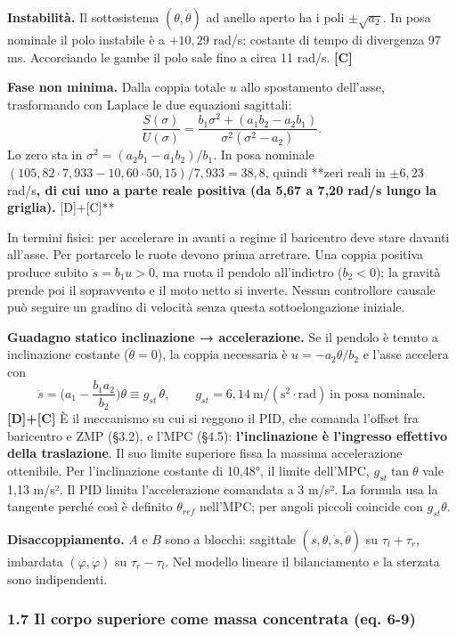 \documentclass[
]{article}
\begin{document}
\textbf{Instabilità.} Il sottosistema \((\theta, \dot\theta)\) ad anello aperto ha i poli \(\pm\sqrt{a_2}\). In posa nominale il polo instabile è a \(+10{,}29\) rad/s: costante di tempo di divergenza 97 ms. Accorciando le gambe il polo sale fino a circa 11 rad/s. \textbf{[C]}

\textbf{Fase non minima.} Dalla coppia totale \(u\) allo spostamento dell'asse, trasformando con Laplace le due equazioni sagittali: \[\frac{S(\sigma)}{U(\sigma)} = \frac{b_1\sigma^2 + (a_1b_2 - a_2b_1)}{\sigma^2(\sigma^2 - a_2)} .\] Lo zero sta in \(\sigma^2 = (a_2b_1 - a_1b_2)/b_1\). In posa nominale \((105{,}82\cdot7{,}933 - 10{,}60\cdot50{,}15)/7{,}933 = 38{,}8\), quindi **zeri reali in \(\pm 6{,}23\) rad/s\textbf{, di cui uno a parte reale positiva (da 5,67 a 7,20 rad/s lungo la griglia). }[D]+[C]**

In termini fisici: per accelerare in avanti a regime il baricentro deve stare davanti all'asse. Per portarcelo le ruote devono prima arretrare. Una coppia positiva produce subito \(\ddot s = b_1u > 0\), ma ruota il pendolo all'indietro (\(b_2 < 0\)); la gravità prende poi il sopravvento e il moto netto si inverte. Nessun controllore causale può seguire un gradino di velocità senza questa sottoelongazione iniziale.

\textbf{Guadagno statico inclinazione → accelerazione.} Se il pendolo è tenuto a inclinazione costante (\(\ddot\theta = 0\)), la coppia necessaria è \(u = -a_2\theta/b_2\) e l'asse accelera con \[\ddot s = \Big(a_1 - \frac{b_1a_2}{b_2}\Big)\theta \equiv g_{st}\,\theta,\qquad g_{st} = 6{,}14\ \mathrm{m/(s^2\cdot rad)}\ \text{in posa nominale}.\] \textbf{[D]+[C]} È il meccanismo su cui si reggono il PID, che comanda l'offset fra baricentro e ZMP (§3.2), e l'MPC (§4.5): \textbf{l'inclinazione è l'ingresso effettivo della traslazione}. Il suo limite superiore fissa la massima accelerazione ottenibile. Per l'inclinazione costante di 10,48°, il limite dell'MPC, \(g_{st}\tan\theta\) vale 1,13 m/s². Il PID limita l'accelerazione comandata a 3 m/s². La formula usa la tangente perché così è definito \(\theta_{ref}\) nell'MPC; per angoli piccoli coincide con \(g_{st}\theta\).

\textbf{Disaccoppiamento.} \(A\) e \(B\) sono a blocchi: sagittale \((s, \theta, \dot s, \dot\theta)\) su \(\tau_l+\tau_r\), imbardata \((\varphi, \dot\varphi)\) su \(\tau_r-\tau_l\). Nel modello lineare il bilanciamento e la sterzata sono indipendenti.

\subsubsection{1.7 Il corpo superiore come massa concentrata (eq. 6-9)}\label{17-il-corpo-superiore-come-massa-concentrata-eq-6-9}
\end{document}
